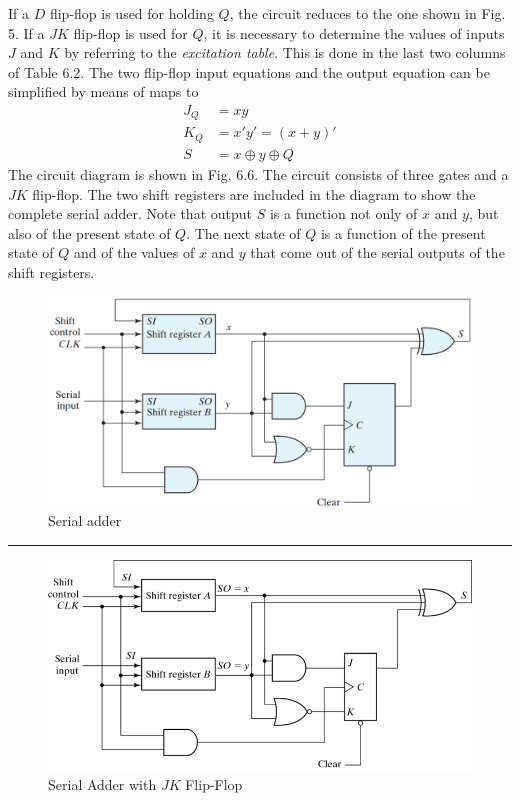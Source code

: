 If a $D$ flip-flop is used for holding $Q$, the circuit reduces to the one shown in Fig. 5. If a $JK$ flip-flop is used for $Q$, it is necessary to determine the values of inputs $J$ and $K$ by referring to the \textit{excitation table}. This is done in the last two columns of Table 6.2. The two flip-flop input equations and the output equation can be simplified by means of maps to
\begin{align*}
  J_Q &= xy\\
  K_Q &= x'y' = (x + y)'\\
  S &= x \oplus y \oplus Q
\end{align*}
The circuit diagram is shown in Fig. 6.6. The circuit consists of three gates and a $JK$ flip-flop. The two shift registers are included in the diagram to show the complete serial adder. Note that output $S$ is a function not only of $x$ and $y$, but also of the present state of $Q$. The next state of $Q$ is a function of the present state of $Q$ and of the values of $x$ and $y$ that come out of the serial outputs of the shift registers.
\begin{figure}[H]
  \centering
  \includegraphics[width=\linewidth]{img/fig-6.6.png}
  \caption{Serial adder}
  \label{fig:6.6}
\end{figure}

\noindent\rule{\linewidth}{1pt}

\begin{figure}[H]
  \centering
  \includegraphics[width=\linewidth]{img/serial-adder-with-JK-FF.png}
  \caption*{Serial Adder with $JK$ Flip-Flop}
  \label{fig:serial-adder-with-jk-ff}
\end{figure}

